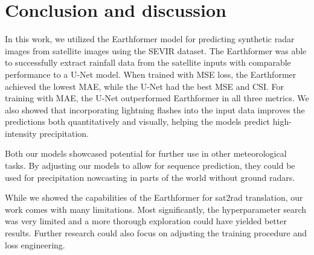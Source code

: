\documentclass[english]{mvi-report}
\begin{document}
\section{Conclusion and discussion}
In this work, we utilized the Earthformer model for predicting synthetic radar images from satellite images using the SEVIR dataset. The Earthformer was able to successfully extract rainfall data from the satellite inputs with comparable performance to a U-Net model. When trained with MSE loss, the Earthformer achieved the lowest MAE, while the U-Net had the best MSE and CSI. For training with MAE, the U-Net outperformed Earthformer in all three metrics. We also showed that incorporating lightning flashes into the input data improves the predictions both quantitatively and visually, helping the models predict high-intensity precipitation.

Both our models showcased potential for further use in other meteorological tasks. By adjusting our models to allow for sequence prediction, they could be used for precipitation nowcasting in parts of the world without ground radars.

While we showed the capabilities of the Earthformer for sat2rad translation, our work comes with many limitations. Most significantly, the hyperparameter search was very limited and a more thorough exploration could have yielded better results. Further research could also focus on adjusting the training procedure and loss engineering.

\printbibliography
\end{document}
